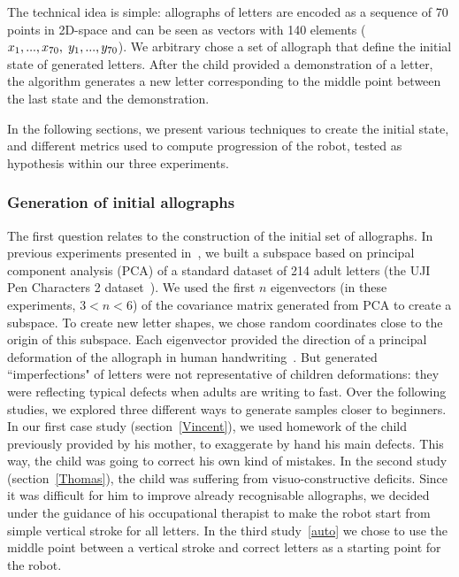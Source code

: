 \documentclass[conference]{IEEEtran}
\begin{document}
The technical idea is simple: allographs of letters are encoded as a sequence of 70 points in
2D-space and can be seen as vectors with 140 elements
($x_1,...,x_{70},\hspace{1mm}y_1,...,y_{70}$). We arbitrary chose a set of allograph
that define the initial state of generated letters. 
After the child provided a demonstration of a letter, the algorithm
generates a new letter corresponding to the middle point between the last state and the
demonstration. 

In the following sections, we present various techniques to
create the initial state, and different metrics used to compute progression of the robot, tested as hypothesis within our three experiments. 

\subsubsection{Generation of initial allographs}
The first question relates to the construction of the initial set of allographs.
In previous experiments presented in~\cite{hood2015when}, we built a subspace based on principal component
analysis (PCA) of a standard dataset of 214 adult letters (the UJI Pen Characters 2 dataset~\cite{Llorens2008}).
We used the first $n$ eigenvectors (in
these experiments, $3 < n < 6$) of the covariance matrix
generated from PCA to create a subspace. To create new letter shapes, we chose
random coordinates close to the origin of this subspace. Each eigenvector
provided the direction of a principal deformation of the allograph in human
handwriting~\cite{Hood}. But generated ``imperfections" of letters were not representative of
children deformations: they were reflecting typical defects when adults are writing to fast. 
Over the following studies, we explored three different ways to generate samples closer to beginners. In our first case study (section~\ref{Vincent}), we used homework of the child previously provided
by his mother, to exaggerate by hand his main defects. This way, the child was
going to correct his own kind of mistakes. In the second study (section~\ref{Thomas}),
the child was suffering from visuo-constructive deficits. Since it was
difficult for him to improve already recognisable allographs, we decided under the
guidance of his occupational therapist to make the robot start from simple
vertical stroke for all letters. In
the third study~\ref{auto} we chose to use the middle point between a vertical stroke
and correct letters as a starting point for the robot. 
\end{document}
